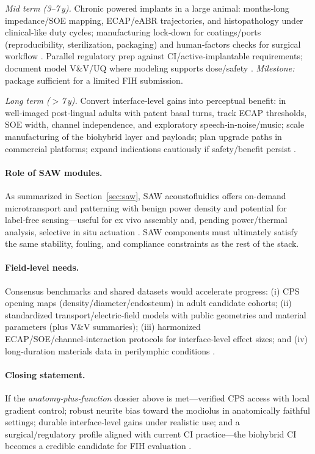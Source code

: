 \documentclass[referee,pdflatex, sn-vancouver-num]{sn-jnl}%
\theoremstyle{thmstyleone}%
\theoremstyle{thmstyletwo}%
\theoremstyle{thmstylethree}%
\begin{document}
\textit{Mid term (3–7\,y).} Chronic powered implants in a large animal: months‑long impedance/SOE mapping, ECAP/eABR trajectories, and histopathology under clinical‑like duty cycles; manufacturing lock‑down for coatings/ports (reproducibility, sterilization, packaging) and human‑factors checks for surgical workflow \cite{Dalrymple2020,Horne2023,Rebscher2008}. Parallel regulatory prep against CI/active‑implantable requirements; document model V\&V/UQ where modeling supports dose/safety \cite{ISO14708-7:2016_CI,USFDA2021InSilico,ASMEVV40_2018}. \textit{Milestone:} package sufficient for a limited FIH submission.

\textit{Long term ($>\!$7\,y).} Convert interface‑level gains into perceptual benefit: in well‑imaged post‑lingual adults with patent basal turns, track ECAP thresholds, SOE width, channel independence, and exploratory speech‑in‑noise/music; scale manufacturing of the biohybrid layer and payloads; plan upgrade paths in commercial platforms; expand indications cautiously if safety/benefit persist \cite{wilson2008,wilson2014}.

\paragraph{Role of SAW modules.}
As summarized in Section~\ref{sec:saw}, SAW acoustofluidics offers on‑demand microtransport and patterning with benign power density and potential for label‑free sensing—useful for ex vivo assembly and, pending power/thermal analysis, selective in situ actuation \cite{Friend2011,Ding2013,rufo2022,Agostini2021_UHFSAW}. SAW components must ultimately satisfy the same stability, fouling, and compliance constraints as the rest of the stack.

\paragraph{Field‑level needs.}
Consensus benchmarks and shared datasets would accelerate progress: (i) CPS opening maps (density/diameter/endosteum) in adult candidate cohorts; (ii) standardized transport/electric‑field models with public geometries and material parameters (plus V\&V summaries); (iii) harmonized ECAP/SOE/channel‑interaction protocols for interface‑level effect sizes; and (iv) long‑duration materials data in perilymphic conditions \cite{Vecchi2024,SaltPlontke2009}. 

\paragraph{Closing statement.}
If the \emph{anatomy‑plus‑function} dossier above is met—verified CPS{} access with local gradient control; robust neurite bias toward the modiolus in anatomically faithful settings; durable interface‑level gains under realistic use; and a surgical/regulatory profile aligned with current CI practice—the biohybrid CI becomes a credible candidate for FIH evaluation \cite{raskandersen2006,Micco2006,wilson2008,ISO14708-7:2016_CI}.



\end{document}
